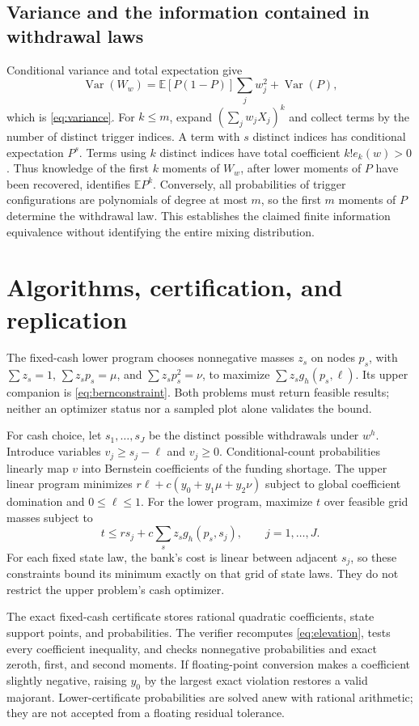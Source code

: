 \documentclass[11pt]{article}
\theoremstyle{definition}\newtheorem{definition}[theorem]{Definition}
\newcommand{\E}{\mathbb E}
\begin{document}
\subsection{Variance and the information contained in withdrawal laws}
Conditional variance and total expectation give
\[\operatorname{Var}(W_w)=\E[P(1-P)]\sum_jw_j^2+\operatorname{Var}(P),\]
which is \eqref{eq:variance}. For \(k\leq m\), expand \((\sum_jw_jX_j)^k\) and collect terms by the number of distinct trigger indices. A term with \(s\) distinct indices has conditional expectation \(P^s\). Terms using \(k\) distinct indices have total coefficient \(k!e_k(w)>0\). Thus knowledge of the first \(k\) moments of \(W_w\), after lower moments of \(P\) have been recovered, identifies \(\E P^k\). Conversely, all probabilities of trigger configurations are polynomials of degree at most \(m\), so the first \(m\) moments of \(P\) determine the withdrawal law. This establishes the claimed finite information equivalence without identifying the entire mixing distribution.

\section{Algorithms, certification, and replication}\label{app:algorithm}
The fixed-cash lower program chooses nonnegative masses \(z_s\) on nodes \(p_s\), with \(\sum z_s=1\), \(\sum z_sp_s=\mu\), and \(\sum z_sp_s^2=\nu\), to maximize \(\sum z_sg_h(p_s,\ell)\). Its upper companion is \eqref{eq:bernconstraint}. Both problems must return feasible results; neither an optimizer status nor a sampled plot alone validates the bound.

For cash choice, let \(s_1,\ldots,s_J\) be the distinct possible withdrawals under \(w^h\). Introduce variables \(v_j\geq s_j-\ell\) and \(v_j\geq0\). Conditional-count probabilities linearly map \(v\) into Bernstein coefficients of the funding shortage. The upper linear program minimizes \(r\ell+c(y_0+y_1\mu+y_2\nu)\) subject to global coefficient domination and \(0\leq\ell\leq1\). For the lower program, maximize \(t\) over feasible grid masses subject to
\[t\leq r s_j+c\sum_sz_sg_h(p_s,s_j),\qquad j=1,\ldots,J.\]
For each fixed state law, the bank's cost is linear between adjacent \(s_j\), so these constraints bound its minimum exactly on that grid of state laws. They do not restrict the upper problem's cash optimizer.

The exact fixed-cash certificate stores rational quadratic coefficients, state support points, and probabilities. The verifier recomputes \eqref{eq:elevation}, tests every coefficient inequality, and checks nonnegative probabilities and exact zeroth, first, and second moments. If floating-point conversion makes a coefficient slightly negative, raising \(y_0\) by the largest exact violation restores a valid majorant. Lower-certificate probabilities are solved anew with rational arithmetic; they are not accepted from a floating residual tolerance.
\end{document}
